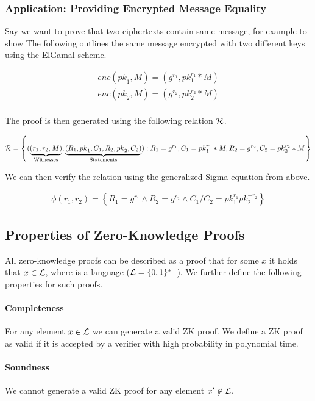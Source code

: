 \subsubsection{Application: Providing Encrypted Message Equality}
Say we want to prove that two ciphertexts contain same message, for example to show 
The following outlines the same message encrypted with two different keys using the ElGamal scheme.

\begin{align*}
{enc}({pk}_1, M) = (g^{r_1}, pk_1^{r_1} *M) \\
{enc}({pk}_2, M) = (g^{r_2}, {pk}_2^{r_2} * M) \\
\end{align*}

The proof is then generated using the following relation ${\cal R}$.

\begin{align*}
    {\cal R} = \left\{ ( \underbrace{(r_1, r_2, M)}_{\text{Witnesses}}, \underbrace{(R_1, {pk}_1, C_1, R_2, {pk}_2, C_2)}_{\text{Statements}} ) : R_1 = g^{r_1}, C_1 = {pk}_1^{r_1} *M, R_2 = g^{r_2}, C_2 = {pk}_2^{r_2} * M \right\}
\end{align*}

We can then verify the relation using the generalized Sigma equation from above.

\begin{align*}
    \phi(r_1, r_2) = \left\{ R_1 = g^{r_1} \land R_2 = g^{r_2} \land C_1 / C_2 = pk_1^{r_1} pk_2^{-r_2} \right\}
\end{align*}

\subsection{Properties of Zero-Knowledge Proofs}
All zero-knowledge proofs can be described as a proof that for some $x$ it holds that $x \in {\cal L}$, where is a language (${\cal L} = \{0,1\}^{*}$~\cite{goldwasser1989knowledge}).
We further define the following properties for such proofs.

\paragraph{Completeness} For any element $x \in {\cal L}$ we can generate a valid ZK proof.
We define a ZK proof as valid if it is accepted by a verifier with high probability in polynomial time.

\paragraph{Soundness} We cannot generate a valid ZK proof for any element $x' \not \in {\cal L}$. 

